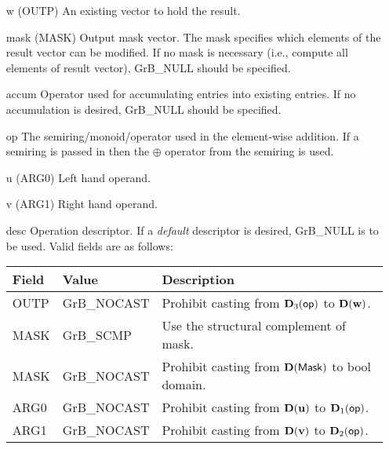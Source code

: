 \begin{itemize}[leftmargin=1.1in]
    \item[{\sf w}]     ({\sf OUTP}) An existing vector to hold the result.

    \item[{\sf mask}] ({\sf MASK}) Output mask vector. The mask
    specifies which elements of the result vector can be modified.
    If no mask is necessary (i.e., compute all elements of result
    vector), {\sf GrB\_NULL} should be specified.

    \item[{\sf accum}]  Operator used for accumulating entries into existing
                         entries. If no accumulation is desired,
                        {\sf GrB\_NULL} should be specified.

    \item[{\sf op}]    The semiring/monoid/operator used in the element-wise addition.
                       If a semiring is passed in then the $\oplus$  operator from
                                    the semiring is used.
    \item[{\sf u}]     ({\sf ARG0}) Left hand operand.
    \item[{\sf v}]     ({\sf ARG1}) Right hand operand.

    \item[{\sf desc}]  Operation descriptor. If a
    \emph{default} descriptor is desired, {\sf GrB\_NULL} is to be
    used. Valid fields are as follows: \\
    \begin{tabular}{lll}
    Field  & Value & Description \\
    \hline
    {\sf OUTP} & {\sf GrB\_NOCAST} & Prohibit casting from $\bold{D}_3({\sf op})$ to $\bold{D}({\bf w})$. \\
    {\sf MASK} & {\sf GrB\_SCMP} & Use the structural complement of {\sf mask}. \\
    {\sf MASK} & {\sf GrB\_NOCAST} & Prohibit casting from $\bold{D}({\sf Mask})$ to {\sf bool} domain. \\
    {\sf ARG0} & {\sf GrB\_NOCAST} & Prohibit casting from $\bold{D}({\bf u})$ to $\bold{D}_1({\sf op})$. \\
    {\sf ARG1} & {\sf GrB\_NOCAST} & Prohibit casting from $\bold{D}({\bf v})$ to $\bold{D}_2({\sf op})$. \\
    \end{tabular}
\end{itemize}

